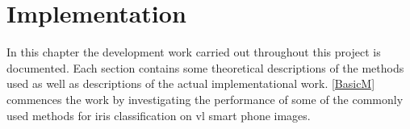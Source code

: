 \graphicspath{{figures/implementation/}}
\chapter{Implementation}\label{ch:implementation}\glsresetall

In this chapter the development work carried out throughout this project is documented. Each section contains some theoretical descriptions of the methods used as well as descriptions of the actual implementational work. \autoref{BasicM} commences the work by investigating the performance of some of the commonly used methods for iris classification on \gls{vl} smart phone images.





